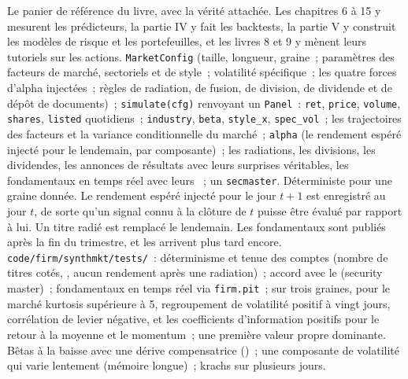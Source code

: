 \begin{build}
 Le panier de référence du livre, avec la vérité attachée. Les chapitres 6 à 15 y mesurent les prédicteurs, la partie IV y fait les backtests,
la partie V y construit les modèles de risque et les portefeuilles, et les livres 8 et 9 y mènent leurs tutoriels sur les actions.
 \texttt{MarketConfig} (taille, longueur, graine~; paramètres des facteurs de marché, sectoriels et de style~; volatilité spécifique~; les
quatre forces d'alpha injectées~; règles de radiation, de fusion, de division, de dividende et de dépôt de documents)~; \texttt{simulate(cfg)} renvoyant un \texttt{Panel}~:
\texttt{ret}, \texttt{price}, \texttt{volume}, \texttt{shares}, \texttt{listed} quotidiens~; \texttt{industry}, \texttt{beta},
\texttt{style\_x}, \texttt{spec\_vol}~; les trajectoires des facteurs et la variance conditionnelle du marché~; \texttt{alpha} (le rendement espéré injecté
pour le lendemain, par composante)~; les radiations, les divisions, les dividendes, les annonces de résultats avec leurs surprises véritables, les fondamentaux en temps réel
avec leurs ~; un \texttt{secmaster}.
 Déterministe pour une graine donnée. Le rendement espéré injecté pour le jour $t+1$ est enregistré au jour $t$, de sorte qu'un signal connu à
la clôture de $t$ puisse être évalué par rapport à lui. Un titre radié est remplacé le lendemain. Les fondamentaux sont publiés après la fin du trimestre,
et les  arrivent plus tard encore.
 \texttt{code/firm/synthmkt/tests/}~: déterminisme et tenue des comptes (nombre de titres cotés, , aucun rendement
après une radiation)~; accord avec le  (security master)~; fondamentaux en temps réel via \texttt{firm.pit}~; sur trois graines, pour le marché
kurtosis supérieure à 5, regroupement de volatilité positif à vingt jours, corrélation de levier négative, et les
coefficients d'information positifs pour le retour à la moyenne et le momentum~; une première valeur propre dominante.
 Bêtas à la baisse avec une dérive compensatrice ()~; une composante de volatilité
qui varie lentement (mémoire longue)~; krachs sur plusieurs jours.
\end{build}


